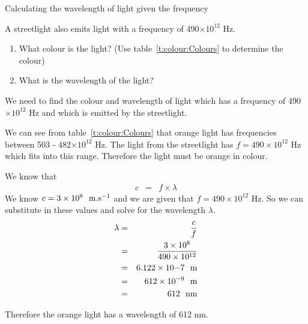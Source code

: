\begin{wex}{Calculating the wavelength of light given the frequency}
{A streetlight also emits light with a frequency of 490$ \times 10^{12}$ Hz.
\begin{enumerate}
\item What colour is the light? (Use table~\ref{t:colour:Colours} to determine the colour)
\item What is the wavelength of the light? 
\end{enumerate}
}
{
We need to find the colour and wavelength of light which has a frequency of 490$ \times 10^{12}$ Hz and which is emitted by the streetlight.

We can see from table~\ref{t:colour:Colours} that orange light has frequencies between 503 - 482$\times 10^{12}$ Hz. The light from the streetlight has $f = 490\times 10^{12}$ Hz which fits into this range. Therefore the light must be orange in colour.

We know that 
\begin{eqnarray*}
c &=& f \times \lambda 
\end{eqnarray*}
We know $c = 3 \times 10^{8}~~\rm{m.s^{-1}}$ and we are given that $f = 490 \times 10^{12}$ Hz. So we can substitute in these values and solve for the wavelength $\lambda$.
\begin{eqnarray*}
\lambda &=& \frac{c}{f} \\
&=& \frac{3 \times 10^{8}}{490\times 10^{12}} \\
&=& 6.122 \times 10{-7}~~\rm{m} \\
&=& 612 \times 10^{-9}~~\rm{m} \\
&=& 612~~\rm{nm}
\end{eqnarray*}

Therefore the orange light has a wavelength of 612 nm.

}
\end{wex}


